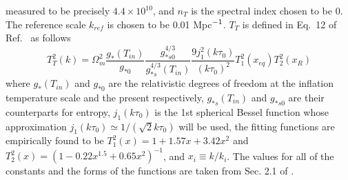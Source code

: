 \documentclass[prd,twocolumn,aps,psfig,nofootinbib,nobibnotes,superscriptaddress,preprintnumbers,times]{revtex4-2}
\begin{document}
\hspace{-1em}measured to be precisely $4.4\times 10^{10}$, and $n_T$ is the spectral index chosen to be 0. The reference scale $k_{ref}$ is chosen to be 0.01 Mpc$\/^{-1}$. $T_{T}$ is defined in Eq.\ 12 of Ref.\ \cite{Kuroyanagi:2015} as follows 
\begin{equation}\label{eqn:tt}
    T_T^2(k) = \Omega_m^2 \frac{g_*(T_{in})}{g_{*0}} \frac{g_{*s0}^{4/3}}{g_{*s}^{4/3}(T_{in})} \frac{9j_1^2(k\tau_0)}{(k\tau_0)^2}T_1^2(x_{eq}) T_2^2(x_R)
\end{equation}
where $g_{*}(T_{in})$ and $g_{*0}$ are the relativistic degrees of freedom at the inflation temperature scale and the present respectively, $g_{*s}(T_{in})$ and $g_{*s0}$ are their counterparts for entropy, $j_1(k\tau_0)$ is the 1st spherical Bessel function whose approximation $j_1(k\tau_0) \simeq 1/(\sqrt{2}k\tau_0)$ will be used, the fitting functions are empirically found to be $T_1^2(x) = 1+1.57x+3.42x^2$ and $T_2^2(x) = (1-0.22x^{1.5} + 0.65x^2)^{-1}$, and $x_i \equiv k/k_i$. The values for all of the constants and the forms of the functions are taken from Sec. 2.1 of \cite{Kuroyanagi:2015}. 
\end{document}

